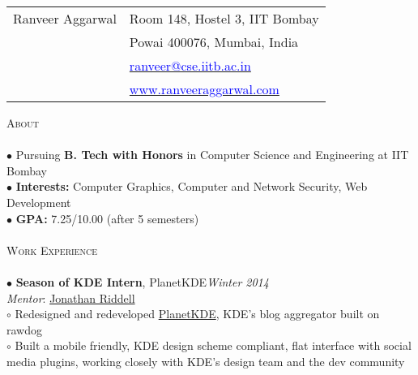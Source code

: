 \documentclass[a4paper,9pt]{article}
\begin{document}

\begin{tabularx}{\textwidth}{p{}>{\raggedleft\arraybackslash}p{}}
\textcolor{myrust}{\Huge{Ranveer Aggarwal}} & \textcolor{mydarkgray}{Room 148, Hostel 3, IIT Bombay}\\
 & \textcolor{mydarkgray}{Powai 400076, Mumbai, India}\\
 & \href{mailto:ranveer@cse.iitb.ac.in}{\textcolor{blue}{ranveer@cse.iitb.ac.in}}\\
 & \href{http://www.ranveeraggarwal.com}{\textcolor{blue}{www.ranveeraggarwal.com}}\\
\end{tabularx}

\vspace{31pt}


\textcolor{myrust}{\large{\textsc{About}}}\textcolor{mygray}{\sout{\hfill}}\\\\
\small %
$\bullet$ Pursuing \textbf{B. Tech with Honors} in Computer Science and Engineering at IIT Bombay\\
$\bullet$ \textbf{Interests:} Computer Graphics, Computer and Network Security, Web Development\\
$\bullet$ \textbf{GPA:} 7.25/10.00 (after 5 semesters)\\\\

\textcolor{myrust}{\large{\textsc{Work Experience}}}\textcolor{mygray}{\sout{\hfill}}\\\\
\small %
$\bullet$ \textbf{Season of KDE Intern}, PlanetKDE\hfill \textit{Winter 2014}\\
\textit{Mentor}: \href{http://jriddell.org/about-me/}{\textcolor{mydarkgray}{Jonathan Riddell}}\\
\hspace*{0.35cm}$\circ$ Redesigned and redeveloped \href{https://planetkde.org/}{PlanetKDE}, KDE’s blog aggregator built on rawdog\\
\hspace*{0.35cm}$\circ$ Built a mobile friendly, KDE design scheme compliant, flat interface with social media plugins, working closely with KDE’s design team and the dev community\\\\
\end{document}

